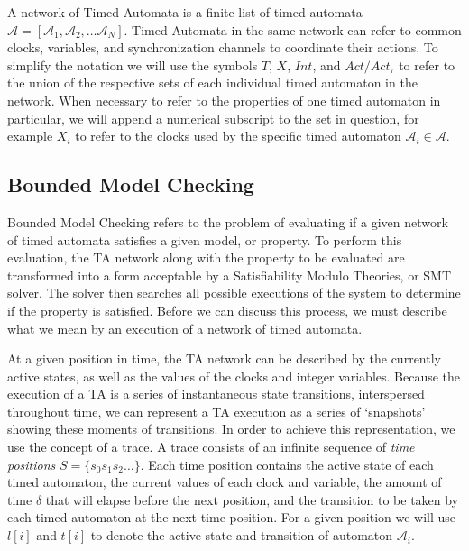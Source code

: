 \documentclass[a4paper,12pt]{article}
\begin{document}
A network of Timed Automata is a finite list of timed automata \(\mathcal{A} =
[\mathcal{A}_1, \mathcal{A}_2, \ldots \mathcal{A}_N]\). Timed Automata in the
same network can refer to common clocks, variables, and synchronization channels
to coordinate their actions. To simplify the notation we will use the symbols
\(T\), \(X\), \(Int\), and \(Act/Act_{\tau}\) to refer to the union of the respective
sets of each individual timed automaton in the network. When necessary to refer
to the properties of one timed automaton in particular, we will append a
numerical subscript to the set in question, for example \(X_i\) to refer to the
clocks used by the specific timed automaton \(\mathcal{A}_{i} \in \mathcal{A}\).

\subsection{Bounded Model Checking}\label{bounded-sat}

%

Bounded Model Checking refers to the problem of evaluating if a given network of
timed automata satisfies a given model, or property. To perform this evaluation,
the TA network along with the property to be evaluated are transformed into a
form acceptable by a Satisfiability Modulo Theories, or SMT solver. The solver
then searches all possible executions of the system to determine if the property
is satisfied. Before we can discuss this process, we must describe what we mean
by an execution of a network of timed automata.

At a given position in time, the TA network can be described by the currently
active states, as well as the values of the clocks and integer variables.
Because the execution of a TA is a series of instantaneous state transitions,
interspersed throughout time, we can represent a TA execution as a series of
`snapshots' showing these moments of transitions. In order to achieve this
representation, we use the concept of a trace. A trace consists of an infinite
sequence of \emph{time positions} $S = \{s_{0}s_{1}s_{2}\ldots\}$. Each time
position contains the active state of each timed automaton, the current values
of each clock and variable, the amount of time $\delta$ that will elapse before
the next position, and the transition to be taken by each timed automaton at the
next time position. For a given position we will use $l[i]$ and $t[i]$
to denote the active state and transition of automaton $\mathcal{A}_{i}$.
\end{document}
